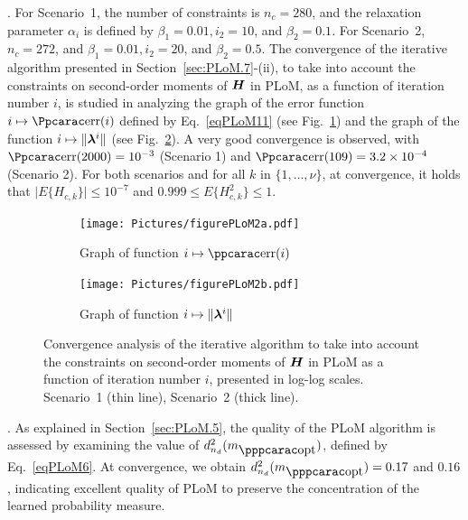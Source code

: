 .
For Scenario~1, the number of constraints is $n_c = 280$, and the relaxation parameter $\alpha_i$ is defined by $\beta_1=0.01, i_2=10$,
and $\beta_2=0.1$. For Scenario~2, $n_c = 272$, and $\beta_1=0.01, i_2=20$, and $\beta_2=0.5$.
%
The convergence of the iterative algorithm presented in Section~\ref{sec:PLoM.7}-(ii), to take into account the constraints on second-order moments of ${\boldsymbol{H}}$ in PLoM, as a function of iteration number $i$, is studied in analyzing the graph of the error function $i\mapsto\err(i)$ defined by Eq.~\eqref{eqPLoM11} (see Fig.~\ref{fig:figurePLoM2a}) and the graph of the function $i\mapsto \Vert{\boldsymbol{\lambda}}^i\Vert$ (see Fig.~\ref{fig:figurePLoM2b}). A very good convergence is observed, with $\err(2000) = 10^{-3}$ (Scenario 1) and $\err(109) = 3.2\times 10^{-4}$ (Scenario 2).
%
For  both  scenarios and for all $k$ in $\{1,\ldots , \nu\}$,  at convergence, it holds that  $\vert E\{ H_{c,k}\}\vert \leq 10^{-7}$ and $0.999 \leq E\{ H_{c,k}^2\} \leq 1$.\\
%
\begin{figure}[!htb]
    \centering
    \begin{subfigure}[b]{0.40\textwidth}
    \centering
        \texttt{[image: Pictures/figurePLoM2a.pdf]}
        \caption{Graph of function $i\mapsto\errp(i)$}
        \label{fig:figurePLoM2a}
    \end{subfigure}
    \centering
    \begin{subfigure}[b]{0.40\textwidth}
    \centering
        \texttt{[image: Pictures/figurePLoM2b.pdf]}
        \caption{Graph of function $i\mapsto \Vert{\boldsymbol{\lambda}}^i\Vert$}
        \label{fig:figurePLoM2b}
    \end{subfigure}
    \caption{Convergence analysis of the iterative algorithm to take into account the constraints on second-order moments of ${\boldsymbol{H}}$ in PLoM as a function of iteration number $i$, presented in log-log scales. Scenario~1 (thin line), Scenario~2 (thick line).}
    \label{fig:figurePLoM2}
\end{figure}

. As explained in Section~\ref{sec:PLoM.5}, the quality of the PLoM algorithm is assessed by examining the value of $d_{n_d}^2(m_\opt)$, defined by Eq.~\eqref{eqPLoM6}. At convergence, we obtain
$d_{n_d}^2(m_\opt) =0.17$ and $0.16$, indicating excellent quality of PLoM to preserve the concentration of the learned probability measure.\\

